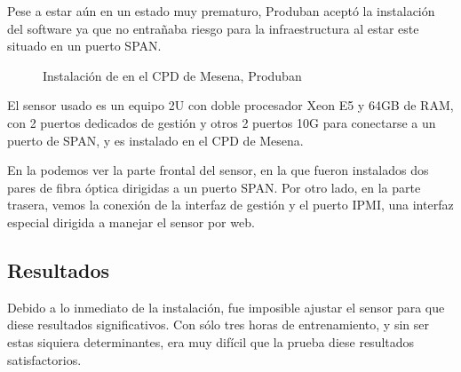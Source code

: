 Pese a estar aún en un estado muy prematuro, Produban aceptó la instalación del software ya que no entrañaba riesgo 
para la infraestructura al estar este situado en un puerto SPAN.

\begin{figure}[hbtp]
\centering
{}
\hfill
{}
%
\caption{Instalación de \redborderddos{} en el CPD de Mesena, Produban}
\end{figure}
%
El sensor usado es un equipo 2U con doble procesador Xeon E5 y 64GB de RAM, con 2 puertos dedicados de gestión y otros 
2 puertos 10G para conectarse a un puerto de SPAN, y es instalado en el CPD de Mesena.

En la  podemos ver la parte frontal del sensor, en la que fueron instalados dos pares de fibra 
óptica dirigidas a un puerto SPAN. Por otro lado, en la parte trasera, vemos la conexión de la interfaz de gestión y el 
puerto IPMI, una interfaz especial dirigida a manejar el sensor por web.

\subsection{Resultados}
Debido a lo inmediato de la instalación, fue imposible ajustar el sensor para que diese resultados significativos. Con 
sólo tres horas de entrenamiento, y sin ser estas siquiera determinantes, era muy difícil que la prueba diese 
resultados satisfactorios.

